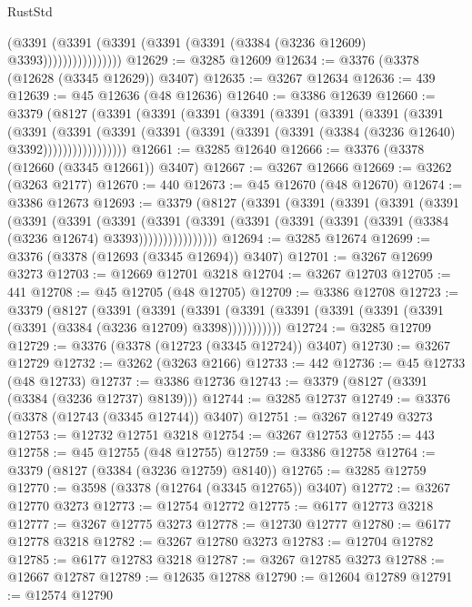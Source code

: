 \begin{lexlean}{RustStd}
\begin{coremodule}
{\begin{coremodule}
{{{{{{{{{{{{{{{{{{{{{{{{{{{{{{{{{{{{{{{                        (@3391
                          (@3391 (@3391 (@3391 (@3391 (@3384 (@3236 @12609) @3393))))))))))))))))
@12629 := @3285 @12609
@12634 := @3376 (@3378 (@12628 (@3345 @12629)) @3407)
@12635 := @3267 @12634
@12636 := 439
@12639 := @45 @12636 (@48 @12636)
@12640 := @3386 @12639
@12660 := @3379
    (@8127
      (@3391
        (@3391
          (@3391
            (@3391
              (@3391
                (@3391
                  (@3391
                    (@3391
                      (@3391
                        (@3391
                          (@3391
                            (@3391 (@3391 (@3391 (@3391 (@3384 (@3236 @12640) @3392)))))))))))))))))
@12661 := @3285 @12640
@12666 := @3376 (@3378 (@12660 (@3345 @12661)) @3407)
@12667 := @3267 @12666
@12669 := @3262 (@3263 @2177)
@12670 := 440
@12673 := @45 @12670 (@48 @12670)
@12674 := @3386 @12673
@12693 := @3379
    (@8127
      (@3391
        (@3391
          (@3391
            (@3391
              (@3391
                (@3391
                  (@3391
                    (@3391
                      (@3391
                        (@3391
                          (@3391 (@3391 (@3391 (@3391 (@3384 (@3236 @12674) @3393))))))))))))))))
@12694 := @3285 @12674
@12699 := @3376 (@3378 (@12693 (@3345 @12694)) @3407)
@12701 := @3267 @12699 @3273
@12703 := @12669 @12701 @3218
@12704 := @3267 @12703
@12705 := 441
@12708 := @45 @12705 (@48 @12705)
@12709 := @3386 @12708
@12723 := @3379
    (@8127
      (@3391
        (@3391
          (@3391 (@3391 (@3391 (@3391 (@3391 (@3391 (@3391 (@3384 (@3236 @12709) @3398)))))))))))
@12724 := @3285 @12709
@12729 := @3376 (@3378 (@12723 (@3345 @12724)) @3407)
@12730 := @3267 @12729
@12732 := @3262 (@3263 @2166)
@12733 := 442
@12736 := @45 @12733 (@48 @12733)
@12737 := @3386 @12736
@12743 := @3379 (@8127 (@3391 (@3384 (@3236 @12737) @8139)))
@12744 := @3285 @12737
@12749 := @3376 (@3378 (@12743 (@3345 @12744)) @3407)
@12751 := @3267 @12749 @3273
@12753 := @12732 @12751 @3218
@12754 := @3267 @12753
@12755 := 443
@12758 := @45 @12755 (@48 @12755)
@12759 := @3386 @12758
@12764 := @3379 (@8127 (@3384 (@3236 @12759) @8140))
@12765 := @3285 @12759
@12770 := @3598 (@3378 (@12764 (@3345 @12765)) @3407)
@12772 := @3267 @12770 @3273
@12773 := @12754 @12772
@12775 := @6177 @12773 @3218
@12777 := @3267 @12775 @3273
@12778 := @12730 @12777
@12780 := @6177 @12778 @3218
@12782 := @3267 @12780 @3273
@12783 := @12704 @12782
@12785 := @6177 @12783 @3218
@12787 := @3267 @12785 @3273
@12788 := @12667 @12787
@12789 := @12635 @12788
@12790 := @12604 @12789
@12791 := @12574 @12790
}}}}}}}}}}}}}}}}}}}}}}}}}}}}}}}}}}}}}}}
\end{coremodule}}
\end{coremodule}
\end{lexlean}
